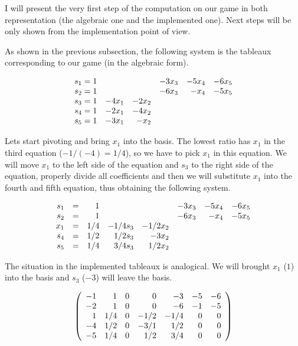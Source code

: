 \documentclass[a4paper,10pt]{article}
\begin{document}
I will present the very first step of the computation on our game in both
representation (the algebraic one and the implemented one). Next steps
will be only shown from the implementation point of view.

As shown in the previous subsection, the following system is the tableaux
corresponding to our game (in the algebraic form).

$$\begin{array}{r r r r r r r r}
s_{1} = 1 &         &         & -3x_{3} & -5x_{4} & -6x_{5} \\
s_{2} = 1 &         &         & -6x_{3} & -x_{4}  & -5x_{5} \\
s_{3} = 1 & -4x_{1} & -2x_{2} &         &         &         \\
s_{4} = 1 & -2x_{1} & -4x_{2} &         &         &         \\
s_{5} = 1 & -3x_{1} & -x_{2}  &         &         &
\end{array}$$

Lets start pivoting and bring $x_{1}$ into the basis. The lowest ratio has
$x_{1}$ in the third equation ($-1/(-4) = 1/4$), so we have to pick
$x_{1}$ in this equation. We will move $x_{1}$ to the left side of the equation
and $s_{3}$ to the right side of the equation, properly divide all coefficients
and then we will substitute $x_{1}$ into the fourth and fifth equation, thus
obtaining the following system.

$$\begin{array}{r r r r r r r r}
s_{1} & = & 1 &             &           & -3x_{3} & -5x_{4} & -6x_{5} \\
s_{2} & = & 1 &             &           & -6x_{3} & -x_{4}  & -5x_{5} \\
x_{1} & = & 1/4 & -1/4s_{3} & -1/2x_{2} &         &         &         \\
s_{4} & = & 1/2 & 1/2s_{3}  & -3x_{2}   &         &         &         \\
s_{5} & = & 1/4 & 3/4s_{3}  & 1/2x_{2}  &         &         &
\end{array}$$

The situation in the implemented tableaux is analogical. We will brought
$x_{1}$ ($1$) into the basis and $s_{3}$ ($-3$) will leave the basis.

$$\left(\begin{array}{r r r r r r r}
-1 & 1 & 0 & 0 & -3 & -5 & -6 \\
-2 & 1 & 0 & 0 & -6 & -1 & -5 \\
1 & 1/4 & 0 & -1/2 & -1/4 & 0 & 0 \\
-4 & 1/2 & 0 & -3/1 & 1/2 & 0 & 0 \\
-5 & 1/4 & 0 & 1/2 & 3/4 & 0 & 0 \\
\end{array}\right)$$
\end{document}
